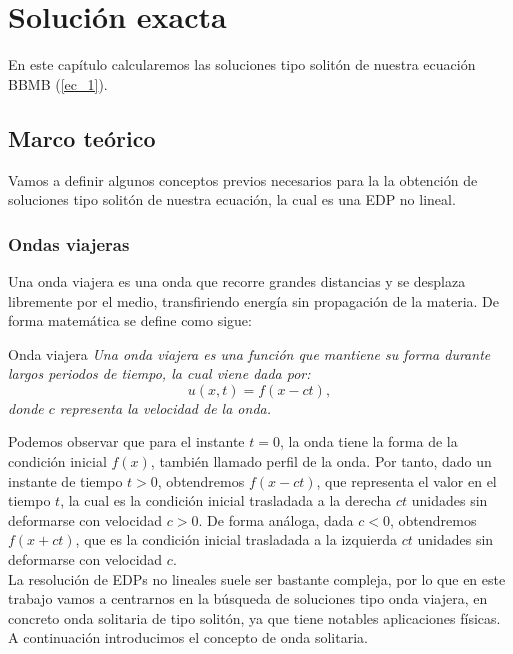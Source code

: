 \chapter{Solución exacta}
\label{cha:primera}


En este capítulo calcularemos las soluciones tipo solitón de nuestra ecuación BBMB (\ref{ec_1}).

\section{Marco teórico}

Vamos a definir algunos conceptos previos necesarios para la la obtención de soluciones tipo solitón de nuestra ecuación, la cual es una EDP no lineal.

\subsection{Ondas viajeras}

Una onda viajera es una onda que recorre grandes distancias y se desplaza libremente por el medio, transfiriendo energía sin propagación de la materia. De forma matemática se define como sigue:

\begin{definicion1}[label={definicion1},nameref={Title or anything else}]{Onda viajera}
    \textit{Una onda viajera es una función que mantiene su forma durante largos periodos de tiempo, la cual viene dada por:}
$$u(x,t)=f(x-ct),$$
\textit{donde $c$ representa la velocidad de la onda.}
\end{definicion1}\label{ondaviajera}

Podemos observar que para el instante $t=0$, la onda tiene la forma de la condición inicial $f(x)$, también llamado perfil de la onda. Por tanto, dado un instante de tiempo $t>0$, obtendremos $f(x-ct)$, que representa el valor en el tiempo $t$, la cual es la condición inicial trasladada a la derecha $ct$ unidades sin deformarse con velocidad $c>0$. De forma análoga, dada $c<0$, obtendremos  $f(x+ct)$, que es la condición inicial trasladada a la izquierda $ct$ unidades sin deformarse con velocidad $c$. \\

La resolución de EDPs no lineales suele ser bastante compleja, por lo que en este trabajo vamos a centrarnos en la búsqueda de soluciones tipo onda viajera, en concreto onda solitaria de tipo solitón, ya que tiene notables aplicaciones físicas. A continuación introducimos el concepto de onda solitaria.

